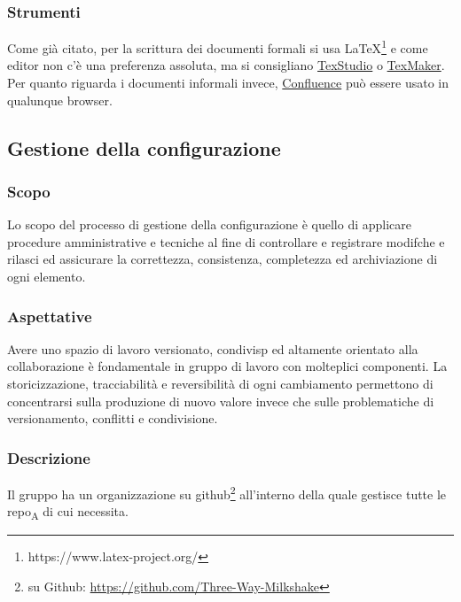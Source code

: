         \subsubsection{Strumenti}
            Come già citato, per la scrittura dei documenti formali si usa \LaTeX\footnote{https://www.latex-project.org/} e come editor non c'è una preferenza assoluta, ma si consigliano \href{http://www.texstudio.org/}{TexStudio} o \href{https://www.xm1math.net/texmaker/}{TexMaker}. Per quanto riguarda i documenti informali invece, \href{https://www.atlassian.com/software/confluence}{Confluence} può essere usato in qualunque browser.


\subsection{Gestione della configurazione}
    \subsubsection{Scopo}
        Lo scopo del processo di gestione della configurazione è quello di applicare procedure amministrative e tecniche al fine di controllare e registrare modifche e rilasci ed assicurare la correttezza, consistenza, completezza ed archiviazione di ogni elemento.
    \subsubsection{Aspettative}
        Avere uno spazio di lavoro versionato, condivisp ed altamente orientato alla collaborazione è fondamentale in gruppo di lavoro con molteplici componenti. La storicizzazione, tracciabilità e reversibilità di ogni cambiamento permettono di concentrarsi sulla produzione di nuovo valore invece che sulle problematiche di versionamento, conflitti e condivisione.
    \subsubsection{Descrizione}
        Il gruppo \group ha un organizzazione su github\footnote{\group su Github: \url{https://github.com/Three-Way-Milkshake}} all'interno della quale gestisce tutte le \acrshort{repo}\textsubscript{A} di cui necessita.
